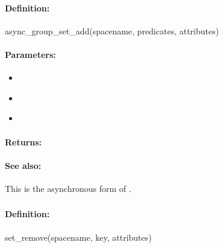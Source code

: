 \paragraph{Definition:}
\begin{rubycode}
async_group_set_add(spacename, predicates, attributes)
\end{rubycode}

\paragraph{Parameters:}
\begin{itemize}[noitemsep]
\item {}\\

\item {}\\

\item {}\\

\end{itemize}

\paragraph{Returns:}


\paragraph{See also:}  This is the asynchronous form of .

\pagebreak
\subsubsection{}
\label{api:ruby:set_remove}


\paragraph{Definition:}
\begin{rubycode}
set_remove(spacename, key, attributes)
\end{rubycode}

